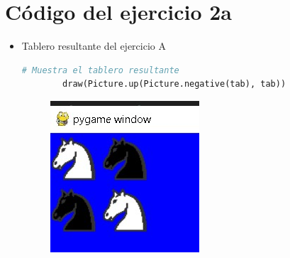 \documentclass{article}
\begin{document}
	\section{Código del ejercicio 2a}
	\begin{itemize}
        \begin{lstlisting}[language=Python, caption={Código del ejercicio A}]
            from chessPictures import *
            from interpreter import draw

            tab = knight
            # Une el caballo con su inverso
            tab = Picture.join(tab, Picture.negative(knight)) 
         \end{lstlisting}

        \item Tablero resultante del ejercicio A
         \begin{lstlisting}[language=Python, caption={Tablero resultante del ejercicio A}]
         # Muestra el tablero resultante
        draw(Picture.up(Picture.negative(tab), tab))
         \end{lstlisting}
		 \begin{figure}[H]
			\centering
			\includegraphics[scale=0.3]{img/ejercicio2a.jpg}
		\end{figure}
	\end{itemize} 
\end{document}
